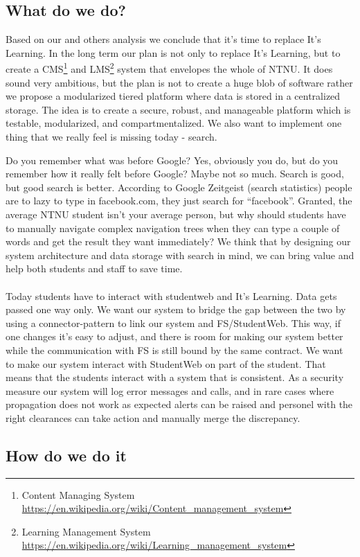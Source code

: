 \subsection{What do we do?}
Based on our and others analysis we conclude that it's time to replace It's Learning. In the long term our plan is not only to replace It's Learning, but to create
a CMS\footnote{Content Managing System \url{https://en.wikipedia.org/wiki/Content_management_system}} and LMS\footnote{Learning Management System \url{https://en.wikipedia.org/wiki/Learning_management_system}} system that envelopes the whole of NTNU. It does sound very ambitious, but the plan is not to create a huge blob of software rather we propose a modularized tiered 
platform where data is stored in a centralized storage. The idea is to create a secure, robust, and manageable platform which is testable, modularized, and compartmentalized.
We also want to implement one thing that we really feel is missing today - search. 


Do you remember what was before Google? Yes, obviously you do, but do you remember how it really felt before Google? Maybe not so much. Search is good, but good search is better. 
According to Google Zeitgeist (search statistics) \cite{google:zeitgeist} people are to lazy to type in facebook.com, they just search for ``facebook''. Granted, the average NTNU 
student isn't your average person, but why should students have to manually navigate complex navigation trees when they can type a couple of words and get the result they want 
immediately? We think that by designing our system architecture and data storage with search in mind, we can bring value and help both students and staff to save time. 
\\\\
Today students have to interact with studentweb and It's Learning. Data gets passed one way only. We want our system to bridge the gap between the two by using a 
connector-pattern %
to link our system and FS/StudentWeb. This way, if one changes it's easy to adjust, and there is room for making our system better while the communication with FS is still bound by 
the same contract. We want to make our system interact with StudentWeb on part of the student. That means that the students interact with a system that is consistent. As a security 
measure our system will log error messages and calls, and in rare cases where propagation does not work as expected alerts can be raised and personel with the right clearances can 
take action and manually merge the discrepancy. %

\subsection{How do we do it}

